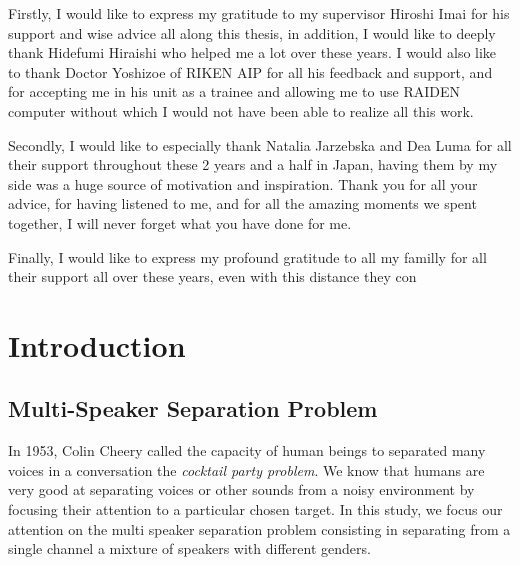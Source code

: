 \documentclass[master,final,11pt]{iscs-thesis}
\begin{document}
\maketitle

\begin{acknowledge}

Firstly, I would like to express my gratitude to my supervisor Hiroshi Imai for his support and wise advice all along this thesis, in addition, I would like to deeply thank Hidefumi Hiraishi who helped me a lot over these years. I would also like to thank Doctor Yoshizoe of RIKEN AIP for all his feedback and support, and for accepting me in his unit as a trainee and allowing me to use RAIDEN computer without which I would not have been able to realize all this work.

Secondly, I would like to especially thank Natalia Jarzebska and Dea Luma for all their support throughout these 2 years and a half in Japan, having them by my side was a huge source of motivation and inspiration. Thank you for all your advice, for having listened to me, and for all the amazing moments we spent together, I will never forget what you have done for me.

Finally, I would like to express my profound gratitude to all my familly for all their support all over these years, even with this distance they con

\end{acknowledge}


\newpage

\tableofcontents

\newpage

\listoffigures %

\listoftables %


\chapter{Introduction}

\nocite{*}

\section{Multi-Speaker Separation Problem}
In 1953, Colin Cheery called the capacity of human beings to separated many voices in a conversation the \textit{cocktail party problem}. We know that humans are very good at separating voices or other sounds from a noisy environment by focusing their attention to a particular chosen target. In this study, we focus our attention on the multi speaker separation problem consisting in separating from a single channel a mixture of speakers with different genders. 
\end{document}
